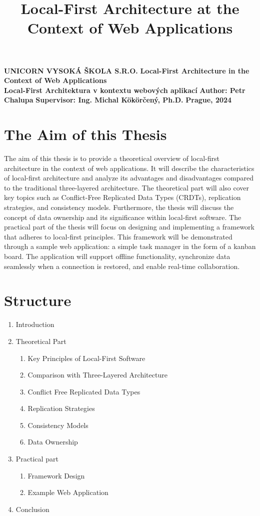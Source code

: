 \documentclass{article}
\title{Local-First Architecture at the Context of Web Applications}
\begin{document}
	\begin{titlepage}
		\begin{center}
			\textbf{UNICORN VYSOKÁ ŠKOLA S.R.O.}
			\vfill
			\textbf{\LARGE Local-First Architecture in the Context of Web Applications\\}
			\vspace{5mm}
			\textbf{Local-First Architektura v kontextu webových aplikací}
			\vfill
			\textbf{Author: Petr Chalupa}
			\vfill
			\textbf{Supervisor: Ing. Michal Kökörčený, Ph.D.}
			\vfill
			\textbf{Prague, 2024}
			\vfill
		\end{center}
	\end{titlepage}
	\newpage
	\section{The Aim of this Thesis}
	The aim of this thesis is to provide a theoretical overview of local-first architecture in the context of web applications. It will describe the characteristics of local-first architecture and analyze its advantages and disadvantages compared to the traditional three-layered architecture. The theoretical part will also cover key topics such as Conflict-Free Replicated Data Types (CRDTs), replication strategies, and consistency models. Furthermore, the thesis will discuss the concept of data ownership and its significance within local-first software.
	The practical part of the thesis will focus on designing and implementing a framework that adheres to local-first principles. This framework will be demonstrated through a sample web application: a simple task manager in the form of a kanban board. The application will support offline functionality, synchronize data seamlessly when a connection is restored, and enable real-time collaboration.

	\section{Structure}
	\begin{enumerate}
		\item Introduction
		\item Theoretical Part
		\begin{enumerate}[label=\arabic{enumi}.\arabic*]
			\item Key Principles of Local-First Software
			\item Comparison with Three-Layered Architecture
			\item Conflict Free Replicated Data Types
			\item Replication Strategies
			\item Consistency Models
			\item Data Ownership
		\end{enumerate}
		\item Practical part
		\begin{enumerate}[label=\arabic{enumi}.\arabic*]
			\item Framework Design
			\item Example Web Application
		\end{enumerate}
		\item Conclusion
	\end{enumerate}
	\nocite{*}
	\printbibliography[title={Literature},heading=bibnumbered]
\end{document}
